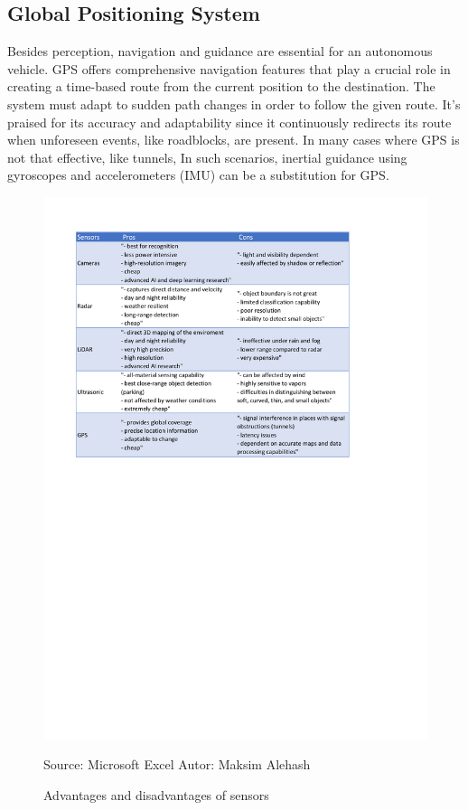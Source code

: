 \documentclass[10pt,oneside,english,a4paper]{article}
\begin{document}
\subsection{Global Positioning System}
\par Besides perception, navigation and guidance are essential for an autonomous vehicle. GPS offers comprehensive navigation features that play a crucial role in creating a time-based route from the current position to the destination. The system must adapt to sudden path changes in order to follow the given route. It's praised for its accuracy and adaptability since it continuously redirects its route when unforeseen events, like roadblocks, are present. In many cases where GPS is not that effective, like tunnels, In such scenarios, inertial guidance using gyroscopes and accelerometers (IMU) can be a substitution for GPS.
\cite{functionalarch, computerarch, stateoftheart, Sensorfusion, AIandIoT}

\begin{figure}[!h]
\centering
\includegraphics[scale=0.4]{tabulka.pdf}
\caption{Advantages and disadvantages of sensors}
{Source: Microsoft Excel}
{Autor: Maksim Alehash}
\label{fig:p_tabulka}
\end{figure}
\end{document}
